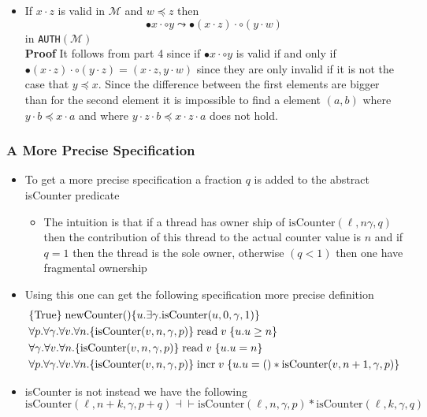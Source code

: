 \begin{itemize}
\begin{itemize}
  \item If $x \cdot z$ is valid in $\mathcal{M}$ and $w \preccurlyeq z$ then
  \[
    \bullet x \cdot \circ y \leadsto \bullet(x \cdot z) \cdot \circ(y \cdot w)
  \]
  in \texttt{AUTH}$(\mathcal M)$ \smallskip \\
  \textbf{Proof} It follows from part 4 since if $\bullet x \cdot \circ y$ is valid if and only if $\bullet(x \cdot z) \cdot \circ(y \cdot z) = (x \cdot z, y \cdot w)$ since they are only invalid if it is not the case that $y \preccurlyeq x$. Since the difference between the first elements are bigger than for the second element it is impossible to find a element $(a,b)$ where $y \cdot b \preccurlyeq x \cdot a$ and where $y \cdot z \cdot b \preccurlyeq x \cdot z \cdot a$ does not hold.
  \end{itemize}
\end{itemize}

\subsubsection{A More Precise Specification}
\begin{itemize}
	\item To get a more precise specification a fraction $q$ is added to the abstract isCounter predicate
  \begin{itemize}
  	\item The intuition is that if a thread has owner ship of $\text{isCounter}(\ell, n \gamma, q)$ then the contribution of this thread to the actual counter value is $n$ and if $q=1$ then the thread is the sole owner, otherwise $(q < 1)$ then one have fragmental ownership
  \end{itemize}
  \item Using this one can get the following specification more precise definition
  \begin{align*}
    &\{\text{True}\} \; \text{newCounter}() \{u. \exists \gamma. \text{isCounter}(u,0,\gamma,1)\} \\
    &\forall p. \forall \gamma. \forall v. \forall n. \{\text{isCounter}(v,n,\gamma, p)\} \; \text{read} \; v \; \{u.u \geq n\} \\
    &\forall \gamma. \forall v. \forall n. \{\text{isCounter}(v,n,\gamma, p)\} \; \text{read} \; v \; \{u.u = n\} \\
    &\forall p. \forall \gamma. \forall v. \forall n. \{\text{isCounter}(v,n,\gamma, p)\} \; \text{incr} \; v \; \{u.u = () * \text{isCounter}(v,n+1,\gamma,p)\}
  \end{align*}
  \item isCounter is not instead we have the following
  \[
    \text{isCounter}(\ell, n+k, \gamma, p + q) \dashv \vdash \text{isCounter}(\ell, n, \gamma, p) * \text{isCounter}(\ell, k, \gamma, q)
  \]
\end{itemize}

\newpage
